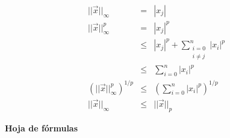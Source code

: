 \documentclass[12pt]{article}
\begin{document}
\begin{enumerate}[leftmargin=*,widest=9]
  \begin{eqnarray*}
  || \vec{x} ||_\infty &=& |x_j|\\
  || \vec{x} ||_\infty^p &=& |x_j|^p\\
  & \leq & |x_j|^p + \sum\limits_{\substack{i=0\\i\neq j}}^n |x_i|^p\\
  & \leq &  \sum\limits_{i=0}^n |x_i|^p\\
  (|| \vec{x} ||_\infty^p)^{1/p} & \leq & \left(\sum\limits_{i=0}^n |x_i|^p \right)^{1/p}\\
  || \vec{x} ||_\infty & \leq & || \vec{x} ||_p
  \end{eqnarray*}
  \end{enumerate}
\clearpage
\begin{center}
\textbf{Hoja de fórmulas}
\end{center}
\end{document}
